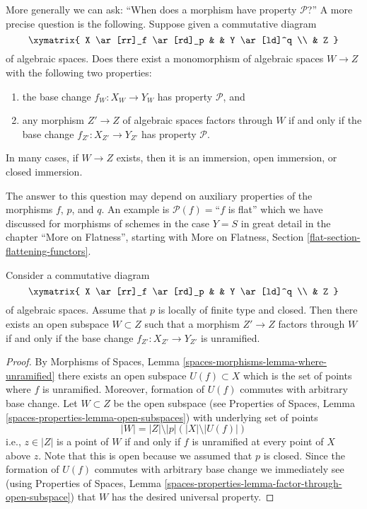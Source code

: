 \noindent
More generally we can ask:
``When does a morphism have property $\mathcal{P}$?''
A more precise question is the following. Suppose given a commutative diagram
$$
\xymatrix{
X \ar[rr]_f \ar[rd]_p & & Y \ar[ld]^q \\
& Z
}
$$
of algebraic spaces. Does there exist a monomorphism of algebraic spaces
$W \to Z$ with the following two properties:
\begin{enumerate}
\item the base change $f_W : X_W \to Y_W$ has property $\mathcal{P}$, and
\item any morphism $Z' \to Z$ of algebraic spaces factors through $W$ if
and only if the base change $f_{Z'} : X_{Z'} \to Y_{Z'}$ has property
$\mathcal{P}$.
\end{enumerate}
In many cases, if $W \to Z$ exists, then it is an immersion, open immersion,
or closed immersion.

\medskip\noindent
The answer to this question may depend on auxiliary properties of the
morphisms $f$, $p$, and $q$. An example is $\mathcal{P}(f) =$``$f$ is flat''
which we have discussed for morphisms of schemes in the case $Y = S$ in
great detail in the chapter ``More on Flatness'', starting with
More on Flatness, Section \ref{flat-section-flattening-functors}.

\begin{lemma}
\label{lemma-where-unramified}
Consider a commutative diagram
$$
\xymatrix{
X \ar[rr]_f \ar[rd]_p & & Y \ar[ld]^q \\
& Z
}
$$
of algebraic spaces. Assume that $p$ is locally of finite type and closed.
Then there exists an open subspace $W \subset Z$
such that a morphism $Z' \to Z$ factors through $W$ if and only if the
base change $f_{Z'} : X_{Z'} \to Y_{Z'}$ is unramified.
\end{lemma}

\begin{proof}
By
Morphisms of Spaces, Lemma \ref{spaces-morphisms-lemma-where-unramified}
there exists an open subspace $U(f) \subset X$ which is the set of
points where $f$ is unramified. Moreover, formation of $U(f)$ commutes
with arbitrary base change. Let $W \subset Z$ be the open subspace
(see
Properties of Spaces, Lemma
\ref{spaces-properties-lemma-open-subspaces})
with underlying set of points
$$
|W| = |Z| \setminus |p|\left(|X| \setminus |U(f)|\right)
$$
i.e., $z \in |Z|$ is a point of $W$ if and only if $f$ is unramified
at every point of $X$ above $z$. Note that this is open because we
assumed that $p$ is closed. Since the formation of $U(f)$
commutes with arbitrary base change we immediately see (using
Properties of Spaces, Lemma
\ref{spaces-properties-lemma-factor-through-open-subspace})
that $W$ has the desired universal property.
\end{proof}

